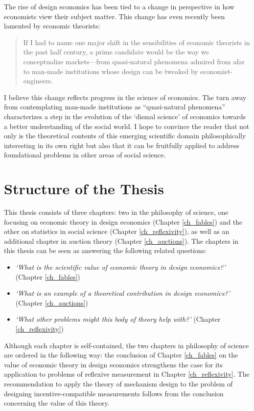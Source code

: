 The rise of design economics has been tied to a change in perspective in how economists view their subject matter. This change has even recently been lamented by economic theorists:
\begin{quote}
    If I had to name one major shift in the sensibilities of economic theorists in the past half century, a prime candidate would be the way we conceptualize markets---from quasi-natural phenomena admired from afar to man-made institutions whose design can be tweaked by economist-engineers. \autocite[p137]{spiegler2024}
\end{quote}
\noindent I believe this change reflects progress in the science of economics. The turn away from contemplating man-made institutions as ``quasi-natural phenomena'' characterizes a step in the evolution of the `dismal science' of economics towards a better understanding of the social world. I hope to convince the reader that not only is the theoretical contents of this emerging scientific domain philosophically interesting in its own right but also that it can be fruitfully applied to address foundational problems in other areas of social science.


\section{Structure of the Thesis}

This thesis consists of three chapters: two in the philosophy of science, one focusing on economic theory in design economics (Chapter \ref{ch_fables}) and the other on statistics in social science (Chapter \ref{ch_reflexivity}), as well as an additional chapter in auction theory (Chapter \ref{ch_auctions}). The chapters in this thesis can be seen as answering the following related questions:

\begin{itemize}
	\item \textit{`What is the scientific value of economic theory in design economics?'} (Chapter \ref{ch_fables})

	\item \textit{`What is an example of a theoretical contribution in design economics?'} (Chapter \ref{ch_auctions})

	\item \textit{`What other problems might this body of theory help with?'} (Chapter \ref{ch_reflexivity})
\end{itemize}

\noindent Although each chapter is self-contained, the two chapters in philosophy of science are ordered in the following way: the conclusion of Chapter \ref{ch_fables} on the value of economic theory in design economics strengthens the case for its application to problems of reflexive measurement in Chapter \ref{ch_reflexivity}. The recommendation to apply the theory of mechanism design to the problem of designing incentive-compatible measurements follows from the conclusion concerning the value of this theory.


